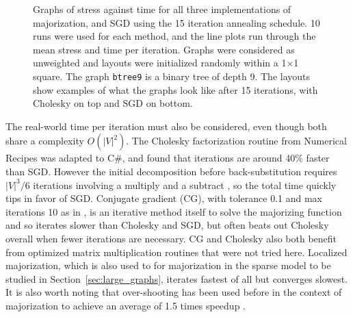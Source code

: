 \begin{figure}
  \centering
  \caption[Stress measured on a further selection of graphs]{Graphs of stress against time for all three implementations of majorization, and SGD using the 15 iteration annealing schedule. 10 runs were used for each method, and the line plots run through the mean stress and time per iteration.
  Graphs were considered as unweighted
  and layouts were initialized randomly within a 1$\times$1 square.
  The graph \texttt{btree9} is a binary tree of depth 9. 
  The layouts show examples of what the graphs look like after 15 iterations, with Cholesky on top and SGD on bottom.
  }
  \label{fig:stress_plots_big}
\end{figure}

The real-world time per iteration must also be considered, even though both share a complexity $O(|V|^2)$. The Cholesky factorization routine from Numerical Recipes \citep{Press2007Cholesky} was adapted to C\#, and found that iterations are around 40\% faster than SGD. However the initial decomposition before back-substitution requires $|V|^3/6$ iterations involving a multiply and a subtract \citep{Press2007Cholesky}, so the total time quickly tips in favor of SGD.
Conjugate gradient (CG), with tolerance 0.1 and max iterations 10 as in \citet{Gansner2013}, is an iterative method itself to solve the majorizing function and so iterates slower than Cholesky and SGD, but often beats out Cholesky overall when fewer iterations are necessary.
CG and Cholesky also both benefit from optimized matrix multiplication routines \citep{Gansner2004} that were not tried here.
Localized majorization, which is also used to for majorization in the sparse model to be studied in Section~\ref{sec:large_graphs}, iterates fastest of all but converges slowest.
It is also worth noting that over-shooting has been used before in the context of majorization to achieve an average of 1.5 times speedup \citep{Wang2012}.

